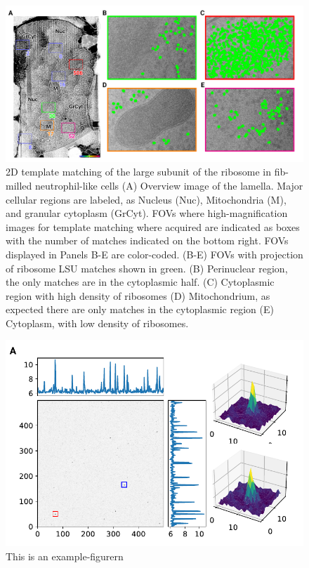 \documentclass[
]{article}
\newenvironment{fignos:tagged-figure}[1][]{
    \let\oldthefigure\thefigure
    \let\oldtheHfigure\theHfigure
    \renewcommand{\thefigure}{#1}
    \renewcommand{\theHfigure}{#1}
  }{
    \let\thefigure\oldthefigure
    \let\theHfigure\oldtheHfigure
    \addtocounter{figure}{-1}
  }
\begin{document}
\begin{figure}
\hypertarget{fig:initmatching}{%
\centering
\includegraphics{figures/initmatching.pdf}
\caption{2D template matching of the large subunit of the ribosome in fib-milled neutrophil-like cells
(A) Overview image of the lamella. Major cellular regions are labeled, as Nucleus (Nuc), Mitochondria (M), and granular cytoplasm (GrCyt). FOVs where high-magnification images for template matching where acquired are indicated as boxes with the number of matches indicated on the bottom right. FOVs displayed in Panels B-E are color-coded.
(B-E) FOVs with projection of ribosome LSU matches shown in green. (B) Perinuclear region, the only matches are in the cytoplasmic half. (C) Cytoplasmic region with high density of ribosomes (D) Mitochondrium, as expected there are only matches in the cytoplasmic region (E) Cytoplasm, with low density of ribosomes.}\label{fig:initmatching}
}
\end{figure}

\begin{fignos:tagged-figure}[S1]

\begin{figure}
\hypertarget{fig:initmatching2}{%
\centering
\includegraphics{figures/initmatching2.pdf}
\caption{This is an example-figurern}\label{fig:initmatching2}
}
\end{figure}

\end{fignos:tagged-figure}
\end{document}
